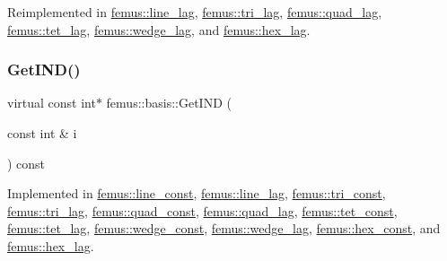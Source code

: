 Reimplemented in \mbox{\hyperlink{classfemus_1_1line__lag_a531a67a6075079df980485134a2ca93a}{femus\+::line\+\_\+lag}}, \mbox{\hyperlink{classfemus_1_1tri__lag_a884d403e16a7d3bb459809ef8e07a74c}{femus\+::tri\+\_\+lag}}, \mbox{\hyperlink{classfemus_1_1quad__lag_a331e1c799946c87cfe43ad7c994aef1b}{femus\+::quad\+\_\+lag}}, \mbox{\hyperlink{classfemus_1_1tet__lag_a92607e302e1bf2526b2750295950f116}{femus\+::tet\+\_\+lag}}, \mbox{\hyperlink{classfemus_1_1wedge__lag_a2e69a8ef73eaecbf5b5abf5db49c3dec}{femus\+::wedge\+\_\+lag}}, and \mbox{\hyperlink{classfemus_1_1hex__lag_a6146b93f321a26a7a40cf3cf51a3d802}{femus\+::hex\+\_\+lag}}.

\mbox{\label{classfemus_1_1basis_a3f63ad97ce70cd4a1196ede69f1f144b}} 
\subsubsection{\texorpdfstring{Get\+I\+N\+D()}{GetIND()}}
{\footnotesize\ttfamily virtual const int$\ast$ femus\+::basis\+::\+Get\+I\+ND (\begin{DoxyParamCaption}\item[{const int \&}]{i }\end{DoxyParamCaption}) const\hspace{0.3cm}{\ttfamily [pure virtual]}}



Implemented in \mbox{\hyperlink{classfemus_1_1line__const_ab73ed11bab4c16cde08b4f8d47ae90f7}{femus\+::line\+\_\+const}}, \mbox{\hyperlink{classfemus_1_1line__lag_ae8291eceb0b48fd46da4112a75832ad2}{femus\+::line\+\_\+lag}}, \mbox{\hyperlink{classfemus_1_1tri__const_a8acedcfc88051ca62d624106f0d78363}{femus\+::tri\+\_\+const}}, \mbox{\hyperlink{classfemus_1_1tri__lag_a4418a7f1b7f2402a647232e7d42b1ce0}{femus\+::tri\+\_\+lag}}, \mbox{\hyperlink{classfemus_1_1quad__const_a44c52292981696a6f8b36a0b3de5598b}{femus\+::quad\+\_\+const}}, \mbox{\hyperlink{classfemus_1_1quad__lag_a363f9b8e94df40dddec713a4a08350a9}{femus\+::quad\+\_\+lag}}, \mbox{\hyperlink{classfemus_1_1tet__const_aa52013fbedd8302be24a2622d45d92a8}{femus\+::tet\+\_\+const}}, \mbox{\hyperlink{classfemus_1_1tet__lag_ad7c531de0360446b1ef3abc2e8c76229}{femus\+::tet\+\_\+lag}}, \mbox{\hyperlink{classfemus_1_1wedge__const_a46e874c0a6d178ba0fbfa4169419c2f7}{femus\+::wedge\+\_\+const}}, \mbox{\hyperlink{classfemus_1_1wedge__lag_a984c32fdfe395886e9cba8a335f845b7}{femus\+::wedge\+\_\+lag}}, \mbox{\hyperlink{classfemus_1_1hex__const_a8dba97c67c9c993a1eedabfd12aac809}{femus\+::hex\+\_\+const}}, and \mbox{\hyperlink{classfemus_1_1hex__lag_ae7c005d638cb17f079302b216114e16e}{femus\+::hex\+\_\+lag}}.

